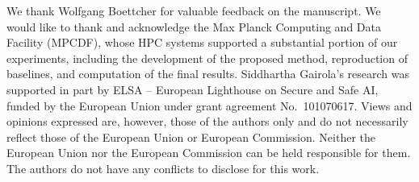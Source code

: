 \begin{ack}
We thank Wolfgang Boettcher for valuable feedback on the manuscript. We would like to thank and acknowledge the Max Planck Computing and Data Facility (MPCDF), whose HPC systems supported a substantial portion of our experiments, including the development of the proposed method, reproduction of baselines, and computation of the final results. Siddhartha Gairola's research was supported in part by ELSA -- European Lighthouse on Secure and Safe AI, funded by the European Union under grant agreement No.~101070617. Views and opinions expressed are, however, those of the authors only and do not necessarily reflect those of the European Union or European Commission. Neither the European Union nor the European Commission can be held responsible for them. The authors do not have any conflicts to disclose for this work.
\end{ack}
